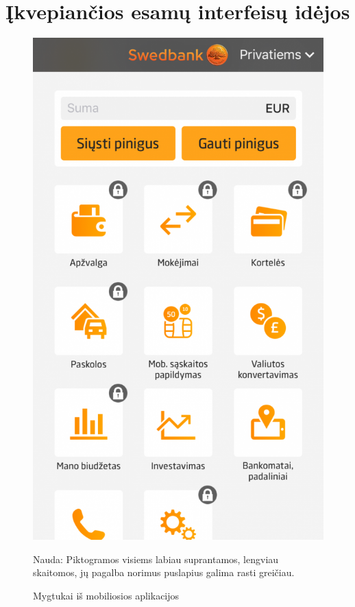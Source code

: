 \documentclass{VUMIFPSkursinis}
\begin{document}
\section{Įkvepiančios esamų interfeisų idėjos}
\begin{figure}[!htb]
  \includegraphics[scale=0.4]{mobileApp.png}
  \caption{Mygtukai iš mobiliosios aplikacijos}
	\label{fig:mobileApp}
	Nauda: Piktogramos visiems labiau suprantamos, lengviau skaitomos, jų pagalba norimus puslapius galima rasti greičiau.
\end{figure}
\end{document}

